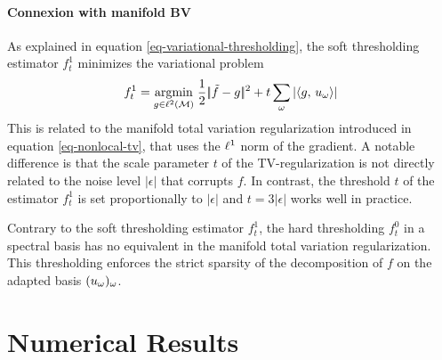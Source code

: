 \documentclass[final]{siamltex}
\newcommand{\F}{f}
\newcommand{\tF}{\tilde \F}
\begin{document}
\paragraph{Connexion with manifold BV}

As explained in equation \eqref{eq-variational-thresholding}, the soft thresholding estimator $\F_t^1$ minimizes the variational problem
\begin{equation*}
	\F_t^1 = \uargmin{g \in \ldeux(\Mm)} \frac{1}{2}\norm{\tF-g}^2 + t \sum_{\om} |\dotp{g}{u_\om}|
\end{equation*}
This is related to the manifold total variation regularization introduced in equation \eqref{eq-nonlocal-tv}, that uses the $\ell^1$ norm of the gradient. A notable difference is that the scale parameter $t$ of the TV-regularization is not directly related to the noise level $|\epsilon|$ that corrupts $\F$. In contrast, the threshold $t$ of the estimator $\F_t^1$ is set proportionally to $|\epsilon|$ and $t=3|\epsilon|$ works well in practice. 

Contrary to the soft thresholding estimator $\F_t^1$, the hard thresholding $\F_t^0$ in a spectral basis has no equivalent in the manifold total variation regularization. This thresholding enforces the strict sparsity of the decomposition of $\F$ on the adapted basis $(u_\omega)_\omega$.



\section{Numerical Results}
\label{sec-numerical-results}
\end{document}
